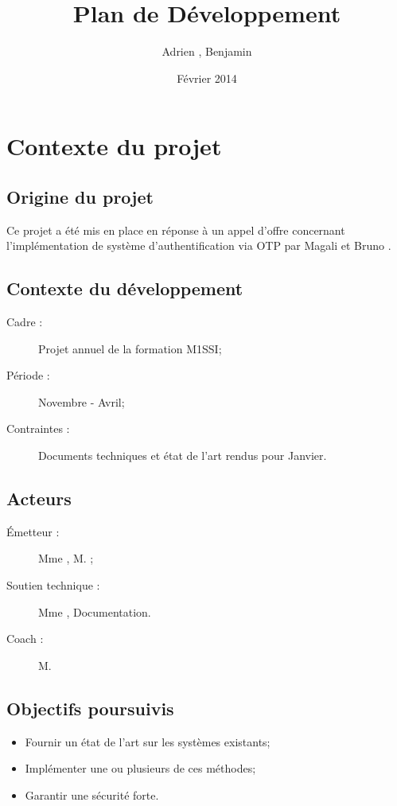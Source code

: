 \documentclass{../../res/univ-projet}
\title{Plan de Développement}
\author{Adrien \bsc{Smondack}, Benjamin \bsc{Zigh}}
\date{Février 2014}
\begin{document}
\maketitle

\section{Contexte du projet}
\subsection{Origine du projet}
	Ce projet a été mis en place en réponse à un appel d'offre concernant l'implémentation de système d'authentification via OTP par Magali  et Bruno .
	
\subsection{Contexte du développement}
	\begin{description} 
		\item [Cadre :] Projet annuel de la formation M1SSI;
		\item [Période :] Novembre - Avril;
		\item [Contraintes :] Documents techniques et état de l'art rendus pour Janvier.
	\end{description}

\subsection{Acteurs}
	\begin{description}
		\item [Émetteur :] Mme , M. ;
		\item [Soutien technique :] Mme , Documentation.
		\item [Coach :] M. 
	\end{description}

\subsection{Objectifs poursuivis}
	\begin{itemize}
		\item Fournir un état de l'art sur les systèmes existants;
		\item Implémenter une ou plusieurs de ces méthodes;
		\item Garantir une sécurité forte.
	\end{itemize}
\end{document}
